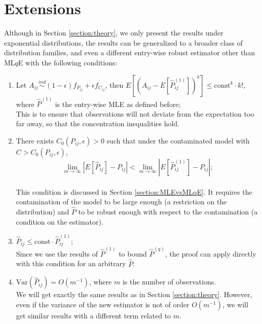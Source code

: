 \documentclass[a4paper]{article}
\renewcommand{\hat}{\widehat}
\begin{document}
\section{Extensions}
\label{section:extension}

Although in Section \ref{section:theory}, we only present the results under exponential distributions, the results can be generalized to a broader class of distribution families, and even a different entry-wise robust estimator other than ML$q$E with the following conditions:
\begin{enumerate}
\item Let $A_{ij} \stackrel{ind}{\sim} (1-\epsilon) f_{P_{ij}} + \epsilon f_{C_{ij}}$, then $E[(A_{ij} - E[\hat{P}_{ij}^{(1)}])^k] \le \mathrm{const}^k \cdot k!$, where $\hat{P}^{(1)}$ is the entry-wise MLE as defined before;\\
This is to ensure that observations will not deviate from the expectation too far away, so that the concentration inequalities hold.
\item There exists $C_0(P_{ij}, \epsilon) > 0$ such that under the contaminated model with $C > C_0(P_{ij}, \epsilon)$,
\[
	\lim_{m \to \infty} \left| E[\hat{P}_{ij}] - P_{ij} \right| < 
    \lim_{m \to \infty} \left| E[\hat{P}^{(1)}_{ij}] - P_{ij} \right|;
\]\\
This condition is discussed in Section \ref{section:MLEvsMLqE}. It requires the contamination of the model to be large enough (a restriction on the distribution) and $\hat{P}$ to be robust enough with respect to the contamination (a condition on the estimator).
\item $\hat{P}_{ij} \le \mathrm{const} \cdot \hat{P}_{ij}^{(1)}$;\\
Since we use the results of $\hat{P}^{(1)}$ to bound $\hat{P}^{(q)}$, the proof can apply directly with this condition for an arbitrary $\hat{P}$.
\item $\mathrm{Var}(\hat{P}_{ij}) = O(m^{-1})$, where $m$ is the number of observations.\\
We will get exactly the same results as in Section \ref{section:theory}. However, even if the variance of the new estimator is not of order $O(m^{-1})$, we will get similar results with a different term related to $m$.
\end{enumerate}
\end{document}
